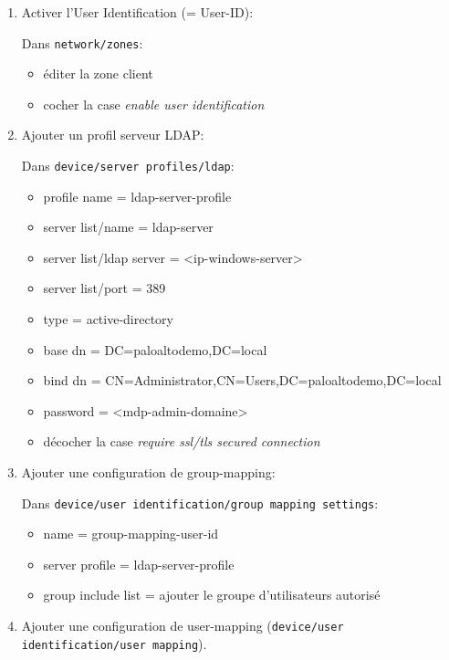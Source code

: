 \documentclass[a4paper]{article}
\begin{document}
\begin{enumerate}
    \item Activer l'User Identification (= User-ID):
    \begin{example}
        Dans \texttt{network/zones}:
        \begin{itemize}
            \item éditer la zone client
            \item cocher la case \textit{enable user identification}
        \end{itemize}
    \end{example}
    \item Ajouter un profil serveur LDAP:
    \begin{example}
        Dans \texttt{device/server profiles/ldap}:
        \begin{itemize}
            \item profile name = ldap-server-profile
            \item server list/name = ldap-server
            \item server list/ldap server = <ip-windows-server>
            \item server list/port = 389
            \item type = active-directory
            \item base dn = DC=paloaltodemo,DC=local
            \item bind dn = CN=Administrator,CN=Users,DC=paloaltodemo,DC=local
            \item password = <mdp-admin-domaine>
            \item décocher la case \textit{require ssl/tls secured connection}
        \end{itemize}
    \end{example}
    \item Ajouter une configuration de group-mapping:
    \begin{example}
        Dans \texttt{device/user identification/group mapping settings}:
        \begin{itemize}
            \item name = group-mapping-user-id
            \item server profile = ldap-server-profile
            \item group include list = ajouter le groupe d'utilisateurs autorisé
        \end{itemize}
    \end{example}
    \item Ajouter une configuration de user-mapping (\texttt{device/user identification/user mapping}).

\end{enumerate}
\end{document}
